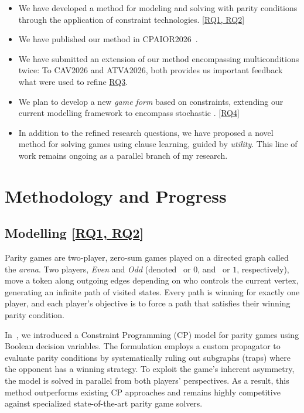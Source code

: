 \documentclass{article}
\begin{document}
\begin{itemize}
  \item We have developed a method for modeling and solving \wregulargames with parity conditions through the application of constraint technologies. [\hyperref[sec:rq]{RQ1, RQ2}]
  \item We have published our method in CPAIOR2026~\cite{Hernandez:2026:noc}.
  \item We have submitted an extension of our method encompassing multiconditions twice: To CAV2026 and ATVA2026, both provides us important feedback what were used to refine \hyperref[sec:rq]{RQ3}.
  \item We plan to develop a new \textit{game form} based on constraints, extending our current modelling framework to encompass stochastic \wregulargames. [\hyperref[sec:rq]{RQ4}]
  \item In addition to the refined research questions, we have proposed a novel method for solving games using clause learning, guided by \textit{utility}. This line of work remains ongoing as a parallel branch of my research.
\end{itemize}

\section{Methodology and Progress}

\subsection{Modelling [\hyperref[sec:rq]{RQ1, RQ2}]}\label{sec:paritygames}

Parity games are two-player, zero-sum games played on a directed graph called the \textit{arena}. Two players, \textit{Even} and \textit{Odd} (denoted~\even{} or $0$, and~\odd{} or $1$, respectively), move a token along outgoing edges depending on who controls the current vertex, generating an infinite path of visited states. Every path is winning for exactly one player, and each player's objective is to force a path that satisfies their winning parity condition.

In~\cite{Hernandez:2026:noc}, we introduced a Constraint Programming (CP) model for parity games using Boolean decision variables. The formulation employs a custom propagator to evaluate parity conditions by systematically ruling out subgraphs (traps) where the opponent has a winning strategy. To exploit the game's inherent asymmetry, the model is solved in parallel from both players' perspectives. As a result, this method outperforms existing CP approaches and remains highly competitive against specialized state-of-the-art parity game solvers.
\end{document}

